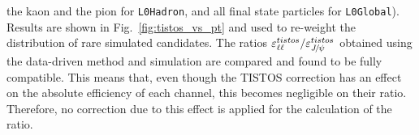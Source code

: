 the kaon and the pion for \verb!L0Hadron!, and all final state particles for \verb!L0Global!).
Results are shown in Fig.~\ref{fig:tistos_vs_pt} and used to re-weight the distribution of rare
simulated candidates.
%
%
The ratios $\varepsilon^{tistos}_{\ell\ell} / \varepsilon^{tistos}_{\jpsi}$ obtained using the data-driven method
and simulation are compared and found to be fully compatible. This means that, even though
the TISTOS correction has an effect on the absolute efficiency of each channel, this becomes negligible on their ratio.
Therefore, no correction due to this effect is applied for the calculation of the \RKst ratio.
%
\begin{table}[t]
\begin{center}
 \caption{Trigger efficiencies obtained using the TISTOS method on
 simulated and real $\decay{\Bz}{\Kstarz\jpsi(\to\ell^+\ell^-)}$ decays.}
\label{tab:tistos}
\end{center}
\end{table}
%
